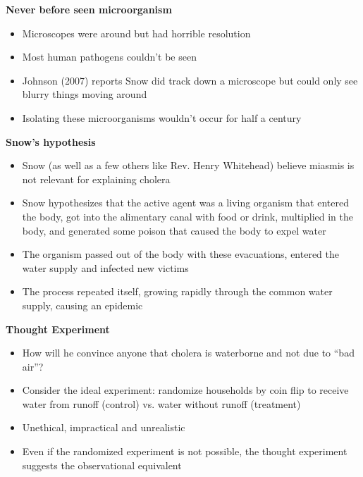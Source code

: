 \documentclass[notes=show]{beamer}
\begin{document}
\begin{frame}[plain]
\begin{center}
\textbf{Never before seen microorganism}
\end{center}

\begin{itemize}
\item Microscopes were around but had horrible resolution
\item Most human pathogens couldn't be seen
\item Johnson (2007) reports Snow did track down a microscope but could only see blurry things moving around
\item Isolating these microorganisms wouldn't occur for half a century
\end{itemize}

\end{frame}



\begin{frame}[plain]
\begin{center}
\textbf{Snow's hypothesis}
\end{center}

\begin{itemize}
	\item Snow (as well as a few others like Rev. Henry Whitehead) believe miasmis is not relevant for explaining cholera
	\item Snow hypothesizes that the active agent was a living organism that entered the body, got into the alimentary canal with food or drink, multiplied in the body, and generated some poison that caused the body to expel water
	\item The organism passed out of the body with these evacuations, entered the water supply and infected new victims
	\item The process repeated itself, growing rapidly through the common water supply, causing an epidemic

\end{itemize}

\end{frame}

\begin{frame}[plain]
\begin{center}
\textbf{Thought Experiment}
\end{center}

\begin{itemize}
\item How will he convince anyone that cholera is waterborne and not due to ``bad air''?  
\item Consider the ideal experiment: randomize households by coin flip to receive water from runoff (control) vs. water without runoff (treatment)
\item Unethical, impractical and unrealistic
\item Even if the randomized experiment is not possible, the thought experiment suggests the observational equivalent
\end{itemize}

\end{frame}
\end{document}
